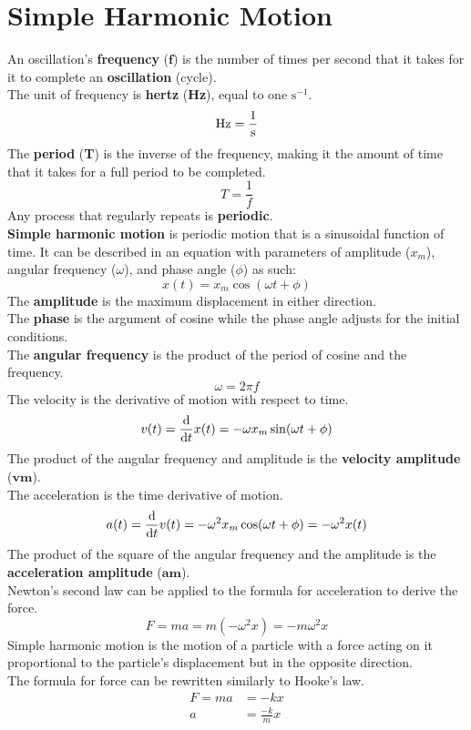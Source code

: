 \documentclass[../AP_Physics_C.tex]{subfiles}
\begin{document}
			\section{Simple Harmonic Motion}
				An oscillation's \textbf{frequency} ($\bm{f}$) is the number of times per second that it takes for it to complete an \textbf{oscillation} (cycle). \\
				The unit of frequency is  \textbf{hertz} (\textbf{Hz}), equal to one $\mathrm{s}^{-1}$.
				\[\operatorname{Hz} = \frac{1}{\operatorname{s}}\]
				The \textbf{period} (\textbf{T}) is the inverse of the frequency, making it the amount of time that it takes for a full period to be completed.
				\[T = \frac{1}{f}\]
				Any process that regularly repeats is \textbf{periodic}. \\
				\textbf{Simple harmonic motion} is periodic motion that is a sinusoidal function of time. It can be described in an equation with parameters of amplitude ($x_m$), angular frequency ($\omega$), and phase angle ($\phi$) as such:
				\[x(t) = x_m\cos(\omega t + \phi)\]
				The \textbf{amplitude} is the maximum displacement in either direction. \\
				The \textbf{phase} is the argument of cosine while the phase angle adjusts for the initial conditions. \\
				The \textbf{angular frequency} is the product of the period of cosine and the frequency.
				\[\omega = 2\pi f\]
				The velocity is the derivative of motion with respect to time.
				\[v(t) = \frac{\mathrm{d}}{\mathrm{d} t}x(t) = -\omega x_m\sin(\omega t + \phi)\]
				The product of the angular frequency and amplitude is the \textbf{velocity amplitude} ($\bm{vm}$). \\
				The acceleration is the time derivative of motion.
				\[a(t) = \frac{\mathrm{d}}{\mathrm{d} t}v(t) = -\omega^2x_m\cos(\omega t + \phi) = -\omega^2x(t)\]
				The product of the square of the angular frequency and the amplitude is the \textbf{acceleration amplitude} ($\bm{am}$). \\
				Newton's second law can be applied to the formula for acceleration to derive the force.
				\[F = ma = m(-\omega^2x) = -m\omega^2x\]
				Simple harmonic motion is the motion of a particle with a force acting on it proportional to the particle's displacement but in the opposite direction. \\
				The formula for force can be rewritten similarly to Hooke's law.
				\begin{align*}
					F = ma &= -kx \\
					a &= \frac{-k}{m}x
				\end{align*}
\end{document}
